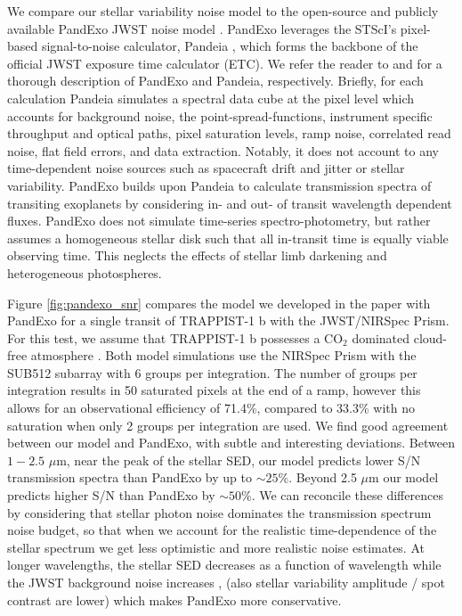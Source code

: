 We compare our stellar variability noise model to the open-source and publicly available PandExo JWST noise model \citep{Batalha2017}. PandExo leverages the STScI's pixel-based signal-to-noise calculator, Pandeia \citep{Pontoppidan2016}, which forms the backbone of the official JWST exposure time calculator (ETC). We refer the reader to \citet{Batalha2017} and \citet{Pontoppidan2016} for a thorough description of PandExo and Pandeia, respectively. Briefly, for each calculation Pandeia simulates a spectral data cube at the pixel level which accounts for background noise, the point-spread-functions, instrument specific throughput and optical paths, pixel saturation levels, ramp noise, correlated read noise, flat field errors, and data extraction. Notably, it does not account to any time-dependent noise sources such as spacecraft drift and jitter or stellar variability. PandExo builds upon Pandeia to calculate transmission spectra of transiting exoplanets by considering in- and out- of transit wavelength dependent fluxes. PandExo does not simulate time-series spectro-photometry, but rather assumes a homogeneous stellar disk such that all in-transit time is equally viable observing time. This neglects the effects of stellar limb darkening and heterogeneous photospheres. 

Figure \ref{fig:pandexo_snr} compares the model we developed in the paper with PandExo for a single transit of TRAPPIST-1 b with the JWST/NIRSpec Prism. For this test, we assume that TRAPPIST-1 b possesses a CO$_2$ dominated cloud-free atmosphere \citep{Lincowski2018}. Both model simulations use the NIRSpec Prism with the SUB512 subarray with 6 groups per integration. The number of groups per integration results in 50 saturated pixels at the end of a ramp, however this allows for an observational efficiency of 71.4\%, compared to 33.3\% with no saturation when only 2 groups per integration are used. We find good agreement between our model and PandExo, with subtle and interesting deviations. Between $1-2.5$ $\mu$m, near the peak of the stellar SED, our model predicts lower S/N transmission spectra than PandExo by up to ${\sim} 25\%$. Beyond 2.5 $\mu$m our model predicts higher S/N than PandExo by ${\sim} 50\%$. We can reconcile these differences by considering that stellar photon noise dominates the transmission spectrum noise budget, so that when we account for the realistic time-dependence of the stellar spectrum we get less optimistic and more realistic noise estimates. At longer wavelengths, the stellar SED decreases as a function of wavelength while the JWST background noise increases \citep{NotSureHere}, (also stellar variability amplitude / spot contrast are lower) which makes PandExo more conservative.

